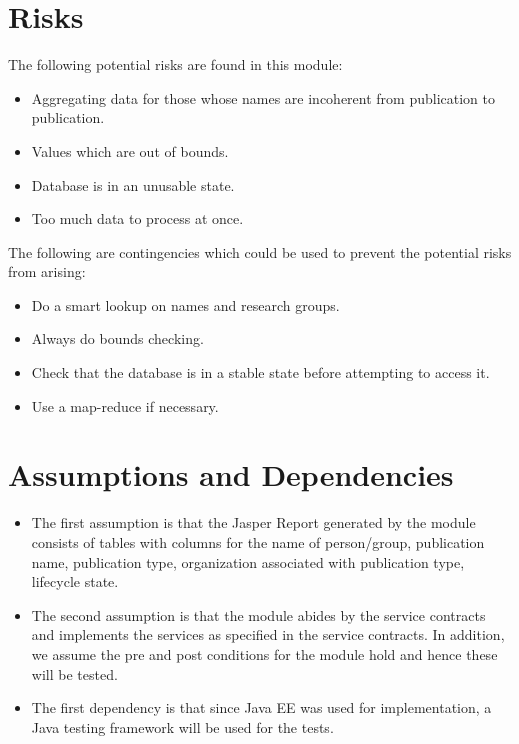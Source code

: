 \section{Risks}
\label{risks}
	The following potential risks are found in this module:
\begin{itemize}
	\item Aggregating data for those whose names are incoherent from publication to publication.
	\item Values  which are out of bounds.
	\item Database is in an unusable state.
	\item Too much data to process at once.
\end{itemize}

	The following are contingencies which could be used to prevent the potential risks from arising:
\begin{itemize}
	\item Do a smart lookup on names and research groups.
	\item Always do bounds checking.
	\item Check that the database is in a stable state before attempting to access it.
	\item Use a map-reduce if necessary.
\end{itemize}

\section{Assumptions and Dependencies}
\label{sec:assumptions}
\begin{itemize}
	\item The first assumption is that the Jasper Report generated by the module consists of tables with columns for the name of person/group, publication name, publication type, organization associated with publication type, lifecycle state.
	\item The second assumption is that the module abides by the service contracts and implements the services as specified in the service contracts. In addition, we assume the pre and post conditions for the module hold and hence these will be tested.
	\item The first dependency is that since Java EE was used for implementation, a Java testing framework will be used for the tests.
\end{itemize}
\hypertarget{labelr}{}
